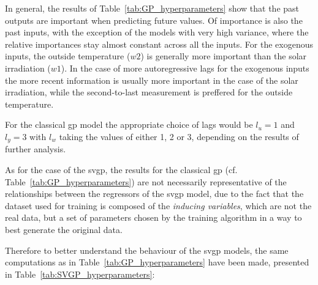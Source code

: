 In general, the results of Table~\ref{tab:GP_hyperparameters} show that the
past outputs are important when predicting future values. Of importance is also
the past inputs, with the exception of the models with very high variance, where
the relative importances stay almost constant across all the inputs. For the
exogenous inputs, the outside temperature ($w2$) is generally more important
than the solar irradiation ($w1$). In the case of more autoregressive lags for
the exogenous inputs the more recent information is usually more important in
the case of the solar irradiation, while the second-to-last measurement is
preffered for the outside temperature.

For the classical \acrshort{gp} model the appropriate choice of lags would be
$l_u = 1$ and $l_y = 3$ with $l_w$ taking the values of either 1, 2 or 3,
depending on the results of further analysis.


As for the case of the \acrlong{svgp}, the results for the classical
\acrshort{gp} (cf. Table~\ref{tab:GP_hyperparameters}) are not necessarily
representative of the relationships between the regressors of the
\acrshort{svgp} model, due to the fact that the dataset used for training is
composed of the \textit{inducing variables}, which are not the real data, but a
set of parameters chosen by the training algorithm in a way to best generate the
original data.

Therefore to better understand the behaviour of the \acrshort{svgp} models, the
same computations as in Table~\ref{tab:GP_hyperparameters} have been made,
presented in Table~\ref{tab:SVGP_hyperparameters}:


